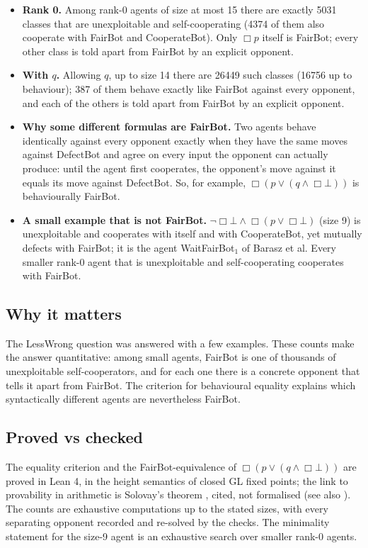 \documentclass{article}
\begin{document}
\begin{itemize}
\item \textbf{Rank 0.} Among rank-0 agents of size at most 15 there are exactly 5031 classes that are unexploitable and self-cooperating (4374 of them also cooperate with FairBot and CooperateBot). Only $\Box p$ itself is FairBot; every other class is told apart from FairBot by an explicit opponent.
\item \textbf{With $q$.} Allowing $q$, up to size 14 there are 26449 such classes (16756 up to behaviour); 387 of them behave exactly like FairBot against every opponent, and each of the others is told apart from FairBot by an explicit opponent.
\item \textbf{Why some different formulas are FairBot.} Two agents behave identically against every opponent exactly when they have the same moves against DefectBot and agree on every input the opponent can actually produce: until the agent first cooperates, the opponent's move against it equals its move against DefectBot. So, for example, $\Box(p \vee (q \wedge \Box\bot))$ is behaviourally FairBot.
\item \textbf{A small example that is not FairBot.} $\neg\Box\bot \wedge \Box(p \vee \Box\bot)$ (size 9) is unexploitable and cooperates with itself and with CooperateBot, yet mutually defects with FairBot; it is the agent WaitFairBot$_1$ of Barasz et al. Every smaller rank-0 agent that is unexploitable and self-cooperating cooperates with FairBot.
\end{itemize}

\subsection*{Why it matters}

The LessWrong question was answered with a few examples. These counts make the answer
quantitative: among small agents, FairBot is one of thousands of unexploitable self-cooperators,
and for each one there is a concrete opponent that tells it apart from FairBot. The criterion for
behavioural equality explains which syntactically different agents are nevertheless FairBot.

\subsection*{Proved vs checked}

The equality criterion and the FairBot-equivalence of $\Box(p \vee (q \wedge \Box\bot))$ are
proved in Lean 4, in the height semantics of closed GL fixed points; the link to provability in
arithmetic is Solovay's theorem \cite{solovay1976provability}, cited, not formalised (see also
\cite{boolos1993logic}). The counts are exhaustive computations up to the stated sizes, with every
separating opponent recorded and re-solved by the checks. The minimality statement for the size-9
agent is an exhaustive search over smaller rank-0 agents.
\end{document}
